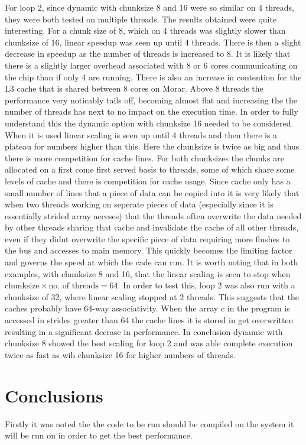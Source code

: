 \documentclass[12pt]{article}    %
\numberwithin{equation}{section}
\begin{document}
For loop 2, since dynamic with chunksize 8 and 16 were so similar on 4 threads, they were both tested on multiple threads.
The results obtained were quite interesting.
For a chunk size of 8, which on 4 threads was slightly slower than chunksize of 16, linear speedup was seen up until 4 threads.
There is then a slight decrease in speedup as the number of threads is increased to 8.
It is likely that there is a slightly larger overhead associated with 8 or 6 cores communicating on the chip than if only 4 are running.
There is also an increase in contention for the L3 cache that is shared between 8 cores on Morar.
Above 8 threads the performance very noticably tails off, becoming almost flat and increasing the the number of threads has next to no impact on the execution time.
In order to fully understand this the dynamic option with chunksize 16 needed to be considered.
When it is used linear scaling is seen up until 4 threads and then there is a plateau for numbers higher than this.
Here the chunksize is twice as big and thus there is more competition for cache lines.
For both chunksizes the chunks are allocated on a first come first served basis to threads, some of which share some levels of cache and there is competition for cache usage.
Since cache only has a small number of lines that a piece of data can be copied into it is very likely that when two threads working on seperate pieces of data  (especially since it is essentially strided array acceses) that the threads often overwrite the data needed by other threads sharing that cache and invalidate the cache of all other threads, even if they didnt overwrite the specific piece of data requiring more flushes to the bus and accesses to main memory. 
This quickly becomes the limiting factor and governs the speed at which the cade can run.
It is worth noting that in both examples, with chunksize 8 and 16, that the linear scaling is seen to stop when $\text{chunksize}\times\text{no. of threads}=64$. 
In order to test this, loop 2 was also run with a chunksize of 32, where linear scaling stopped at 2 threads.
This suggests that the caches probably have 64-way associativity.
When the array c in the program is accessed in strides greater than 64 the cache lines it is stored in get overwritten resulting in a significant decrase in performance.
In conclusion dynamic with chunksize 8 showed the best scaling for loop 2 and was able complete execution twice as fast as wih chunksize 16 for higher numbers of threads.\\


\section{Conclusions}
Firstly it was noted the the code to be run should be compiled on the system it will be run on in order to get the best performance.
\end{document}
